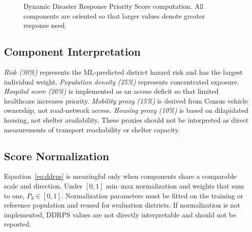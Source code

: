 \documentclass[conference]{IEEEtran}
\begin{document}
\begin{figure}[t]
\centering
{}
\caption{Dynamic Disaster Response Priority Score computation. All components are oriented so that larger values denote greater response need.}
\label{fig:ddrps}
\end{figure}

\subsection{Component Interpretation}
\textit{Risk (30\%)} represents the ML-predicted district hazard risk and has
the largest individual weight. \textit{Population density (25\%)} represents
concentrated exposure. \textit{Hospital score (20\%)} is implemented as an
access deficit so that limited healthcare increases priority.
\textit{Mobility proxy (15\%)} is derived from Census vehicle ownership, not
road-network access. \textit{Housing proxy (10\%)} is based on dilapidated
housing, not shelter availability. These proxies should not be interpreted as
direct measurements of transport reachability or shelter capacity.

\subsection{Score Normalization}
Equation~\eqref{eq:ddrps} is meaningful only when components share a comparable
scale and direction. Under $[0,1]$ min--max normalization and weights that sum
to one, $P_d\in[0,1]$. Normalization parameters must be fitted on the training or
reference population and reused for evaluation districts. If normalization is
not implemented, DDRPS values are not directly interpretable and should not be
reported.
\end{document}
